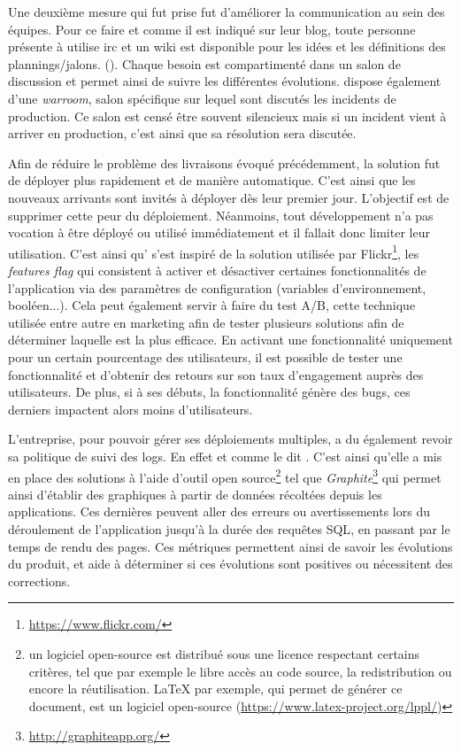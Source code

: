Une deuxième mesure qui fut prise fut d'améliorer la communication au sein des équipes. Pour ce faire et comme il est indiqué sur leur blog, toute personne présente à \etsy{} utilise \gls{irc} et un wiki est disponible pour les idées et les définitions des plannings/jalons. (). Chaque besoin est compartimenté dans un salon de discussion et permet ainsi de suivre les différentes évolutions. \etsy{} dispose également d'une \emph{warroom}, salon spécifique sur lequel sont discutés les incidents de production. Ce salon est censé être souvent silencieux mais si un incident vient à arriver en production, c'est ainsi que sa résolution sera discutée.

Afin de réduire le problème des livraisons évoqué précédemment, la solution fut de déployer plus rapidement et de manière automatique. C'est ainsi que les nouveaux arrivants sont invités à déployer dès leur premier jour. L'objectif est de supprimer cette peur du déploiement. Néanmoins, tout développement n'a pas vocation à être déployé ou utilisé immédiatement et il fallait donc limiter leur utilisation. C'est ainsi qu'\etsy{} s'est inspiré de la solution utilisée par Flickr\footnote{\url{https://www.flickr.com/}}, les \emph{features flag} qui consistent à activer et désactiver certaines fonctionnalités de l'application via des paramètres de configuration (variables d'environnement, booléen...). Cela peut également servir à faire du test A/B, cette technique utilisée entre autre en marketing afin de tester plusieurs solutions afin de déterminer laquelle est la plus efficace. En activant une fonctionnalité uniquement pour un certain pourcentage des utilisateurs, il est possible de tester une fonctionnalité et d'obtenir des retours sur son taux d'engagement auprès des utilisateurs. De plus, si à ses débuts, la fonctionnalité génère des bugs, ces derniers impactent alors moins d'utilisateurs.

L'entreprise, pour pouvoir gérer ses déploiements multiples, a du également revoir sa politique de suivi des logs. En effet et comme \etsy{} le dit . C'est ainsi qu'elle a mis en place des solutions à l'aide d'outil open source\footnote{un logiciel open-source est distribué sous une licence respectant certains critères, tel que par exemple le libre accès au code source, la redistribution ou encore la réutilisation. \LaTeX{} par exemple, qui permet de générer ce document, est un logiciel open-source (\url{https://www.latex-project.org/lppl/})} tel que \emph{Graphite}\footnote{\url{http://graphiteapp.org/}} qui permet ainsi d'établir des graphiques à partir de données récoltées depuis les applications. Ces dernières peuvent aller des erreurs ou avertissements lors du déroulement de l'application jusqu'à la durée des requêtes \gls{SQL}, en passant par le temps de rendu des pages. Ces métriques permettent ainsi de savoir les évolutions du produit, et aide à déterminer si ces évolutions sont positives ou nécessitent des corrections.

